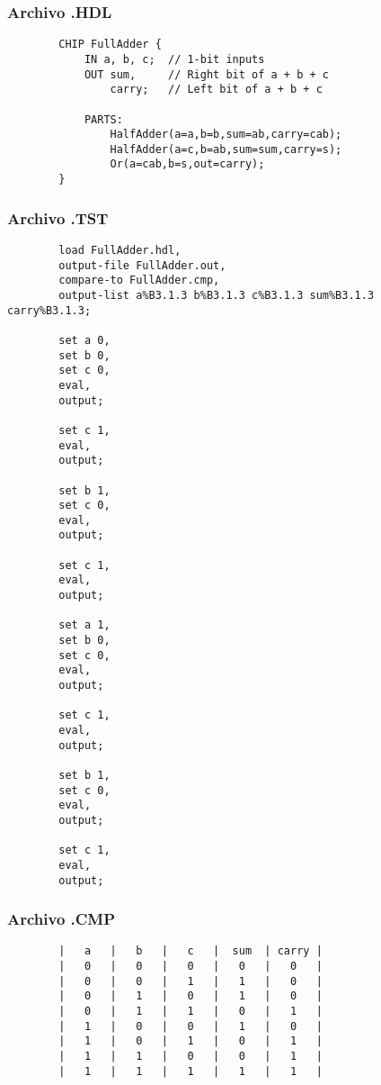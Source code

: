 \documentclass[12pt]{article}
\begin{document}
        \subsubsection{Archivo .HDL}
            \begin{lstlisting}
        CHIP FullAdder {
            IN a, b, c;  // 1-bit inputs
            OUT sum,     // Right bit of a + b + c
                carry;   // Left bit of a + b + c
        
            PARTS:
                HalfAdder(a=a,b=b,sum=ab,carry=cab);
                HalfAdder(a=c,b=ab,sum=sum,carry=s);
                Or(a=cab,b=s,out=carry);
        }
            \end{lstlisting}
        \subsubsection{Archivo .TST}
            \begin{lstlisting}
        load FullAdder.hdl,
        output-file FullAdder.out,
        compare-to FullAdder.cmp,
        output-list a%B3.1.3 b%B3.1.3 c%B3.1.3 sum%B3.1.3 carry%B3.1.3;
        
        set a 0,
        set b 0,
        set c 0,
        eval,
        output;
        
        set c 1,
        eval,
        output;
        
        set b 1,
        set c 0,
        eval,
        output;
        
        set c 1,
        eval,
        output;
        
        set a 1,
        set b 0,
        set c 0,
        eval,
        output;
        
        set c 1,
        eval,
        output;
        
        set b 1,
        set c 0,
        eval,
        output;
        
        set c 1,
        eval,
        output;

            \end{lstlisting}
        \subsubsection{Archivo .CMP}
            \begin{lstlisting}
        |   a   |   b   |   c   |  sum  | carry |
        |   0   |   0   |   0   |   0   |   0   |
        |   0   |   0   |   1   |   1   |   0   |
        |   0   |   1   |   0   |   1   |   0   |
        |   0   |   1   |   1   |   0   |   1   |
        |   1   |   0   |   0   |   1   |   0   |
        |   1   |   0   |   1   |   0   |   1   |
        |   1   |   1   |   0   |   0   |   1   |
        |   1   |   1   |   1   |   1   |   1   |
            \end{lstlisting}
\newpage
\end{document}
